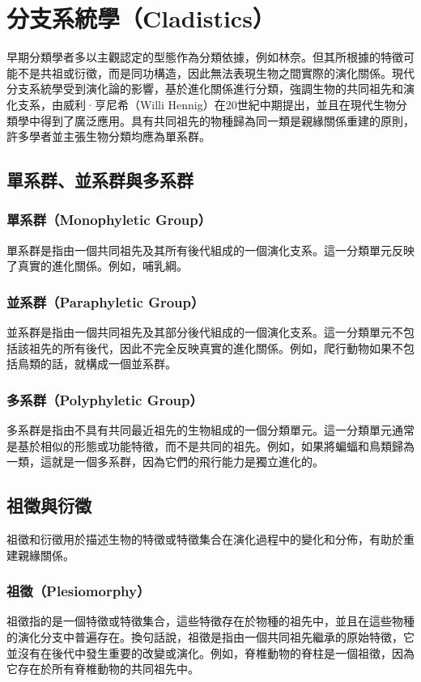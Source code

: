 \documentclass[a4paper,12pt]{report}
\begin{document}
\section{分支系統學（Cladistics）}
早期分類學者多以主觀認定的型態作為分類依據，例如林奈。但其所根據的特徵可能不是共祖或衍徵，而是同功構造，因此無法表現生物之間實際的演化關係。現代分支系統學受到演化論的影響，基於進化關係進行分類，強調生物的共同祖先和演化支系，由威利·亨尼希（Willi Hennig）在20世紀中期提出，並且在現代生物分類學中得到了廣泛應用。具有共同祖先的物種歸為同一類是親緣關係重建的原則，許多學者並主張生物分類均應為單系群。
\subsection{單系群、並系群與多系群}
\subsubsection{單系群（Monophyletic Group）}
單系群是指由一個共同祖先及其所有後代組成的一個演化支系。這一分類單元反映了真實的進化關係。例如，哺乳綱。
\subsubsection{並系群（Paraphyletic Group）}
並系群是指由一個共同祖先及其部分後代組成的一個演化支系。這一分類單元不包括該祖先的所有後代，因此不完全反映真實的進化關係。例如，爬行動物如果不包括鳥類的話，就構成一個並系群。
\subsubsection{多系群（Polyphyletic Group）}
多系群是指由不具有共同最近祖先的生物組成的一個分類單元。這一分類單元通常是基於相似的形態或功能特徵，而不是共同的祖先。例如，如果將蝙蝠和鳥類歸為一類，這就是一個多系群，因為它們的飛行能力是獨立進化的。
\subsection{祖徵與衍徵}
祖徵和衍徵用於描述生物的特徵或特徵集合在演化過程中的變化和分佈，有助於重建親緣關係。
\subsubsection{祖徵（Plesiomorphy）}
祖徵指的是一個特徵或特徵集合，這些特徵存在於物種的祖先中，並且在這些物種的演化分支中普遍存在。換句話說，祖徵是指由一個共同祖先繼承的原始特徵，它並沒有在後代中發生重要的改變或演化。例如，脊椎動物的脊柱是一個祖徵，因為它存在於所有脊椎動物的共同祖先中。
\end{document}
